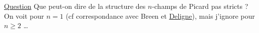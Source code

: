 \uline{Question} Que peut-on dire de la structure des $n$-champs de Picard pas stricts ? On voit pour $n=1$
(cf correspondance avec Breen et \uline{Deligne}), mais
j'ignore pour $n\geq2$ \ldots
